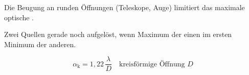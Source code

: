 \begin{runintext}
Die Beugung an runden Öffnungen (Teleskope, Auge) limitiert das maximale optische .
\end{runintext}
\begin{runintext}
Zwei Quellen gerade noch aufgelöst, wenn Maximum der einen im ersten Minimum der anderen.
\end{runintext}
\begin{formulabox}
\[ \alpha_{\mathrm{k}} = 1{,}22\,\frac{\lambda}{D} \quad \text{kreisförmige Öffnung $D$} \]
\end{formulabox}

